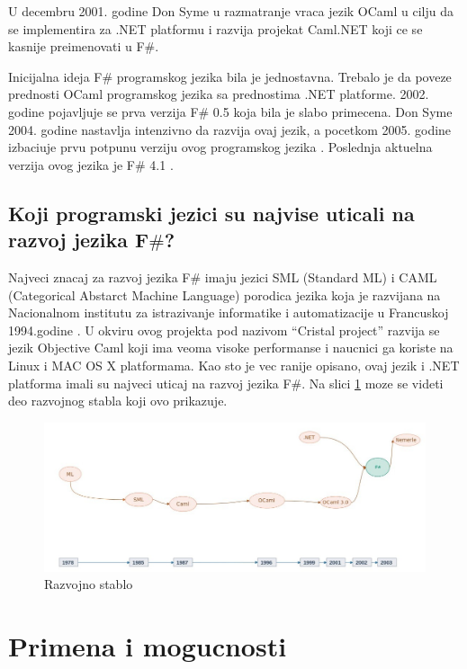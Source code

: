 \documentclass[a4paper]{article}
\begin{document}
U decembru 2001. godine Don Syme u razmatranje vraca jezik OCaml u cilju da se implementira za .NET platformu i razvija projekat Caml.NET koji ce se kasnije preimenovati u F\#.

Inicijalna ideja F\# programskog jezika bila je jednostavna. Trebalo je da poveze prednosti OCaml programskog jezika sa prednostima .NET platforme. 2002. godine pojavljuje se prva verzija F\# 0.5 koja bila je slabo primecena. Don Syme 2004. godine nastavlja intenzivno da razvija ovaj jezik, a pocetkom 2005. godine izbaciuje prvu potpunu verziju ovog programskog jezika \cite{early_history}.
Poslednja aktuelna verzija ovog jezika je F\# 4.1 \cite{fsharp}.

\subsection{Koji programski jezici su najvise uticali na razvoj jezika F$\#$?}
\label{subsec:uticaj}

Najveci znacaj za razvoj jezika F\# imaju jezici SML (Standard ML) i CAML (Categorical Abstarct Machine Language) porodica jezika koja je razvijana na Nacionalnom institutu za istrazivanje informatike i automatizacije u Francuskoj 1994.godine \cite{Harrop:2008:FS:1481410}. U okviru ovog projekta pod nazivom “Cristal project” razvija se jezik Objective Caml koji ima veoma visoke performanse i naucnici ga koriste na Linux i MAC OS X platformama. Kao sto je vec ranije opisano, ovaj jezik i .NET platforma imali su najveci uticaj na razvoj jezika F\#. Na slici \ref{fig:stablo} moze se videti deo razvojnog stabla koji ovo prikazuje.

\begin{figure}[h!]
\begin{center}
\includegraphics[scale=0.29]{stablo.jpg}
\end{center}
\caption{Razvojno stablo}
\label{fig:stablo}
\end{figure}


\section{Primena i mogucnosti}
\label{sec:primena}
\end{document}
